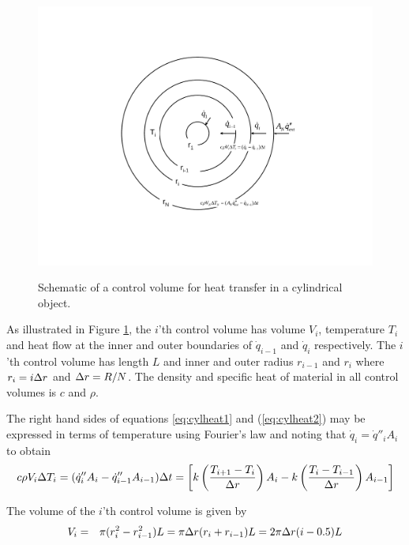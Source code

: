 \begin{figure}[h]
\begin{center}
\includegraphics[width=5.0in]{FIGURES/Theory/cylheat}\\
\end{center}
\caption{Schematic of a control volume for heat transfer in a cylindrical object.}
 \label{fig:cylheat}
\end{figure}
As illustrated in Figure \ref{fig:cylheat}, the $i$'th control volume has
volume $V_i$, temperature $T_i$ and heat flow at the inner
and outer boundaries of $\dot{q}_{i-1}$ and $\dot{q}_i$ respectively.
The $i$'th control volume has length $L$ and inner and outer radius
$r_{i-1}$ and $r_i$ where $r_i=i\Delta r$ and $\Delta r=R/N$.
The density and specific heat of material in all control volumes is
$c$ and $\rho$.

The right hand sides of equations \ref{eq:cylheat1} and (\ref{eq:cylheat2}) may be expressed in terms of temperature using
Fourier's law and noting that $\dot{q}_i=\dot{q}''_iA_i$ to obtain
\begin{equation}
c\rho V_i\Delta T_i=(\dot{q}''_iA_i-\dot{q}''_{i-1}A_{i-1})\Delta t
=
\left[
k\left(\frac{T_{i+1}-T_i}{\Delta r}\right)A_i-k\left(\frac{T_{i}-T_{i-1}}{\Delta r}\right)A_{i-1}
\right]
\label{eq:cylheat2a}
\end{equation}

\noindent The volume of the $i$'th control volume is given by
\begin{eqnarray*}
V_i&=&\pi(r_i^2-r_{i-1}^2)L
=\pi\Delta r(r_i+r_{i-1})L
=2\pi\Delta r(i-0.5) L
\label{eq:cylheat3}
\end{eqnarray*}

